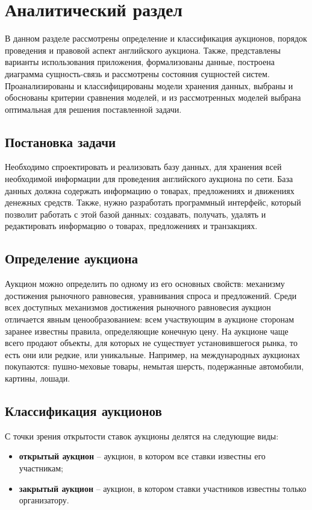 \chapter{Аналитический раздел}
В данном разделе рассмотрены определение и  классификация аукционов, порядок проведения и правовой аспект английского аукциона. Также, представлены варианты использования приложения, формализованы данные, построена диаграмма сущность-связь и рассмотрены состояния сущностей систем. Проанализированы и классифицированы модели хранения данных, выбраны и обоснованы критерии сравнения моделей, и из рассмотренных моделей выбрана оптимальная для решения поставленной задачи.

\section{Постановка задачи}

Необходимо спроектировать и реализовать базу данных, для хранения всей необходимой информации для проведения английского аукциона по сети. База данных должна содержать информацию о товарах, предложениях и движениях денежных средств. Также, нужно разработать программный интерфейс, который позволит работать с этой базой данных: создавать, получать, удалять и редактировать информацию о товарах, предложениях и транзакциях.

\section{Определение аукциона}

Аукцион можно определить по одному из его основных свойств: механизму достижения рыночного равновесия, уравнивания спроса и предложений. Среди всех доступных механизмов достижения рыночного равновесия аукцион отличается явным ценообразованием: всем участвующим в аукционе сторонам заранее известны правила, определяющие конечную цену. На аукционе чаще всего продают объекты, для которых не существует установившегося рынка, то есть они или редкие, или уникальные. Например, на международных аукционах покупаются: пушно-меховые товары, немытая шерсть, подержанные автомобили, картины, лошади. \cite{menezes2004introduction}

\section{Классификация аукционов}

С точки зрения открытости ставок аукционы делятся на следующие виды:
\begin{itemize}
    \item \textbf{открытый аукцион} -- аукцион, в котором все ставки известны его участникам;
    \item \textbf{закрытый аукцион} -- аукцион, в котором ставки участников известны только организатору.
\end{itemize}

